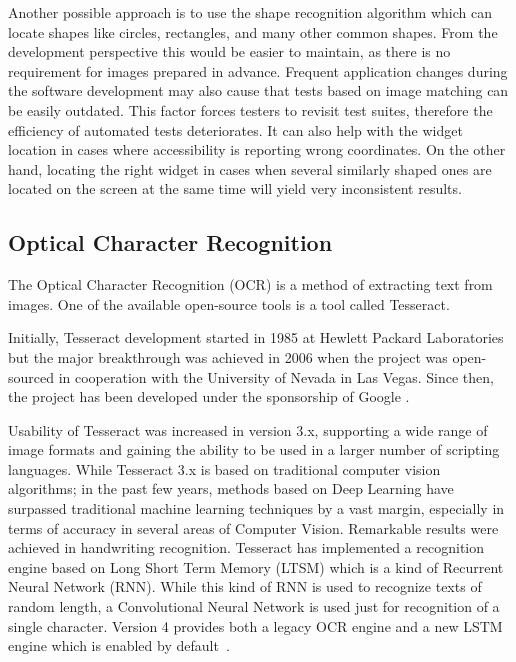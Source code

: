 Another possible approach is to use the shape recognition algorithm which can locate shapes like circles, rectangles, and many other common shapes. From the development perspective this would be easier to maintain, as there is no requirement for images prepared in advance. Frequent application changes during the software development may also cause that tests based on image matching can be easily outdated. This factor forces testers to revisit test suites, therefore the efficiency of automated tests deteriorates. It can also help with the widget location in cases where accessibility is reporting wrong coordinates. On the other hand, locating the right widget in cases when several similarly shaped ones are located on the screen at the same time will yield very inconsistent results.

\subsection{Optical Character Recognition}\label{OCR_section}
The Optical Character Recognition (OCR) is a method of extracting text from images. One of the available open-source tools is a tool called Tesseract.

Initially, Tesseract development started in 1985 at Hewlett Packard Laboratories but the major breakthrough was achieved in 2006 when the project was open-sourced in cooperation with the University of Nevada in Las Vegas. Since then, the project has been developed under the sponsorship of Google \cite{tesseract_history}.

Usability of Tesseract was increased in version 3.x, supporting a wide range of image formats and gaining the ability to be used in a larger number of scripting languages. While Tesseract 3.x is based on traditional computer vision algorithms; in the past few years, methods based on Deep Learning have surpassed traditional machine learning techniques by a vast margin, especially in terms of accuracy in several areas of Computer Vision. Remarkable results were achieved in handwriting recognition. Tesseract has implemented a recognition engine based on Long Short Term Memory (LTSM) which is a kind of Recurrent Neural Network (RNN). While this kind of RNN is used to recognize texts of random length, a Convolutional Neural Network is used just for recognition of a single character. Version 4 provides both a legacy OCR engine and a new LSTM engine which is enabled by default~\cite{tesseract}. 

